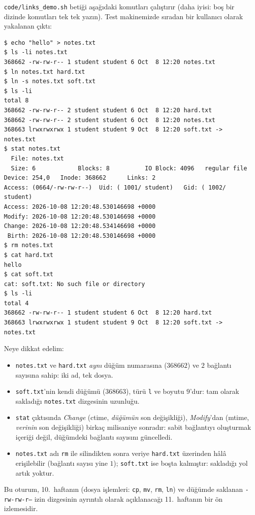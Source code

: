 \documentclass[11pt,a4paper]{article}
\newcommand{\cmd}[1]{\texttt{#1}}
\begin{document}
\cmd{code/links\_demo.sh} betiği aşağıdaki komutları çalıştırır (daha iyisi: boş bir dizinde komutları tek tek yazın). Test makinemizde sıradan bir kullanıcı olarak yakalanan çıktı:

\begin{lstlisting}[style=term]
$ echo "hello" > notes.txt
$ ls -li notes.txt
368662 -rw-rw-r-- 1 student student 6 Oct  8 12:20 notes.txt
$ ln notes.txt hard.txt
$ ln -s notes.txt soft.txt
$ ls -li
total 8
368662 -rw-rw-r-- 2 student student 6 Oct  8 12:20 hard.txt
368662 -rw-rw-r-- 2 student student 6 Oct  8 12:20 notes.txt
368663 lrwxrwxrwx 1 student student 9 Oct  8 12:20 soft.txt -> notes.txt
$ stat notes.txt
  File: notes.txt
  Size: 6            Blocks: 8          IO Block: 4096   regular file
Device: 254,0   Inode: 368662      Links: 2
Access: (0664/-rw-rw-r--)  Uid: ( 1001/ student)   Gid: ( 1002/ student)
Access: 2026-10-08 12:20:48.530146698 +0000
Modify: 2026-10-08 12:20:48.530146698 +0000
Change: 2026-10-08 12:20:48.534146698 +0000
 Birth: 2026-10-08 12:20:48.530146698 +0000
$ rm notes.txt
$ cat hard.txt
hello
$ cat soft.txt
cat: soft.txt: No such file or directory
$ ls -li
total 4
368662 -rw-rw-r-- 1 student student 6 Oct  8 12:20 hard.txt
368663 lrwxrwxrwx 1 student student 9 Oct  8 12:20 soft.txt -> notes.txt
\end{lstlisting}

Neye dikkat edelim:
\begin{itemize}
  \item \texttt{notes.txt} ve \texttt{hard.txt} \emph{aynı} düğüm numarasına ($368662$) ve $2$ bağlantı sayısına sahip: iki ad, tek dosya.
  \item \texttt{soft.txt}'nin kendi düğümü ($368663$), türü \texttt{l} ve boyutu $9$'dur: tam olarak sakladığı \texttt{notes.txt} dizgesinin uzunluğu.
  \item \cmd{stat} çıktısında \emph{Change} (ctime, \emph{düğümün} son değişikliği), \emph{Modify}'dan (mtime, \emph{verinin} son değişikliği) birkaç milisaniye sonradır: sabit bağlantıyı oluşturmak içeriği değil, düğümdeki bağlantı sayısını güncelledi.
  \item \texttt{notes.txt} adı \cmd{rm} ile silindikten sonra veriye \texttt{hard.txt} üzerinden hâlâ erişilebilir (bağlantı sayısı yine $1$); \texttt{soft.txt} ise boşta kalmıştır: sakladığı yol artık yoktur.
\end{itemize}
Bu oturum, 10.\ haftanın (dosya işlemleri: \cmd{cp}, \cmd{mv}, \cmd{rm}, \cmd{ln}) ve düğümde saklanan \texttt{-rw-rw-r--} izin dizgesinin ayrıntılı olarak açıklanacağı 11.\ haftanın bir ön izlemesidir.
\end{document}
